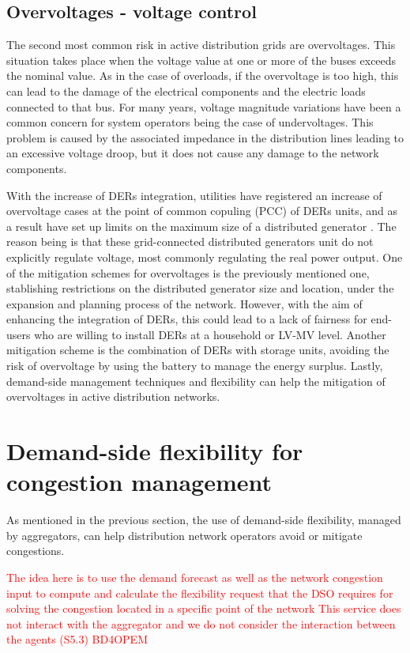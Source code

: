 \subsection{Overvoltages - voltage control}
The second most common risk in active distribution grids are overvoltages. This situation takes place when the voltage value at one or more of the buses exceeds the nominal value. As in the case of overloads, if the overvoltage is too high, this can lead to the damage of the electrical components and the electric loads connected to that bus. 
For many years, voltage magnitude variations have been a common concern for system operators being the case of undervoltages. This problem is caused by the associated impedance in the distribution lines leading to an excessive voltage droop, but it does not cause any damage to the network components.  

With the increase of DERs integration, utilities have registered an increase of overvoltage cases at the point of common copuling (PCC) of DERs units, and as a result have set up limits on the maximum size of a distributed generator \cite{Kennedy2014}. The reason being is that these grid-connected distributed generators unit do not explicitly regulate voltage, most commonly regulating the real power output. One of the mitigation schemes for overvoltages is the previously mentioned one, stablishing restrictions on the distributed generator size and location, under the expansion and planning process of the network. However, with the aim of enhancing the integration of DERs, this could lead to a lack of fairness for end-users who are willing to install DERs at a household or LV-MV level. Another mitigation scheme is the combination of DERs with storage units, avoiding the risk of overvoltage by using the battery to manage the energy surplus. Lastly, demand-side management techniques and flexibility can help the mitigation of overvoltages in active distribution networks. 

\section{Demand-side flexibility for congestion management}
As mentioned in the previous section, the use of demand-side flexibility, managed by aggregators, can help distribution network operators avoid or mitigate congestions. 


\textcolor{red}{The idea here is to use the demand forecast as well as the network congestion input to compute and calculate the flexibility request that the DSO requires for solving the congestion located in a specific point of the network}
\textcolor{red}{This service does not interact with the aggregator and we do not consider the interaction between the agents (S5.3) BD4OPEM}

